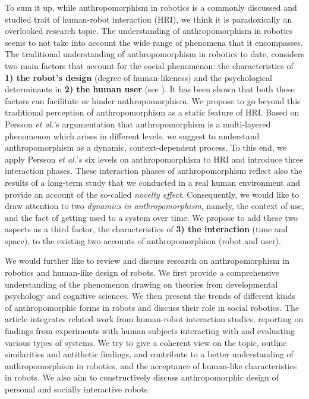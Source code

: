 \documentclass[lettersize, apacite, twoside, HRI]{apa_HRI}
\begin{document}
	To sum it up, while anthropomorphism in robotics is a commonly discussed and studied trait of human-robot interaction (HRI), we think it is paradoxically an overlooked research topic. The understanding of anthropomorphism in robotics seems to not take into account the wide range of phenomena that it encompasses. The traditional understanding of anthropomorphism in robotics to date, considers two main factors that account for the social phenomenon: the characteristics of \textbf{1) the robot's design} (degree of human-likeness) and the psychological determinants in \textbf{2) the human user} (see \cite{epley_seeing_2007}). It has been shown that both these factors can facilitate or hinder anthropomorphism. We propose to go beyond this traditional perception of anthropomorphism as a static feature of HRI. Based on Persson \textit{et al.}'s \cite{persson_anthropomorphism_2000} argumentation that anthropomorphism is a multi-layered phenomenon which arises in different levels, we suggest to understand anthropomorphism as a dynamic, context-dependent process. To this end, we apply Persson \textit{et al.}'s six levels on anthropomorphism to HRI and introduce three interaction phases. These interaction phases of anthropomorphism reflect also the results of a long-term study that we conducted in a real human environment and provide an account of the so-called \textit{novelty effect}. Consequently, we would like to draw attention to two \textit{dynamics in anthropomorphism}, namely, the context of use, and the fact of getting used to a system over time. We propose to add these two aspects as a third factor, the characteristics of \textbf{3) the interaction} (time and space), to the existing two accounts of anthropomorphism (robot and user). 
					
	We would further like to review and discuss research on anthropomorphism in robotics and human-like design of robots. We first provide a comprehensive understanding of the phenomenon drawing on theories from developmental psychology and cognitive sciences. We then present the trends of different kinds of anthropomorphic forms in robots and discuss their role in social robotics. The article integrates related work from human-robot interaction studies, reporting on findings from experiments with human subjects interacting with and evaluating various types of systems. We try to give a coherent view on the topic, outline similarities and antithetic findings, and contribute to a better understanding of anthropomorphism in robotics, and the acceptance of human-like characteristics in robots. We also aim to constructively discuss anthropomorphic design of personal and socially interactive robots. 
	
\end{document}

